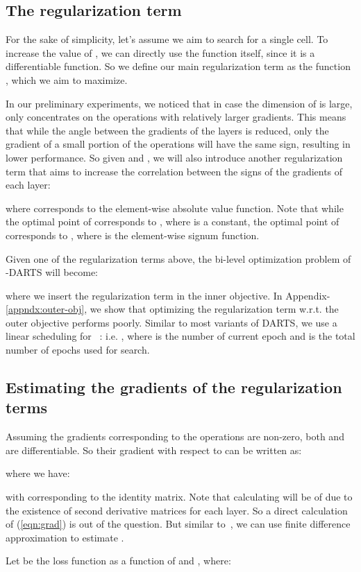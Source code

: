 \documentclass{article} \usepackage{fancyhdr, iclr2023_conference, times}
\newcommand{\mydarts}{-DARTS\xspace}
\begin{document}
\subsection{The regularization term}
For the sake of simplicity, let's assume we aim to search for a single cell. To increase the value of , we can directly use the function itself, since it is a differentiable function. So we define our main regularization term as the function , which we aim to maximize.
\par In our preliminary experiments, we noticed that in case the dimension of  is large,  only concentrates on the operations with relatively larger gradients. This means that while the angle between the gradients of the layers is reduced, only the gradient of a small portion of the operations will have the same sign, resulting in lower performance. So given  and , we will also introduce another regularization term that aims to increase the correlation between the signs of the gradients of each layer:

where  corresponds to the element-wise absolute value function. Note that while the optimal point of  corresponds to , where  is a constant, the optimal point of  corresponds to , where  is the element-wise signum function.
\par Given one of the regularization terms above, the bi-level optimization problem of \mydarts will become:

where we insert the regularization term in the inner objective. In Appendix-\ref{appndx:outer-obj}, we show that optimizing the regularization term w.r.t. the outer objective performs poorly.
Similar to most variants of DARTS, we use a linear scheduling for ~\citep{DBLP:conf/iclr/ZelaESMBH20, DBLP:conf/icml/ChenH20}: i.e. , where  is the number of current epoch and  is the total number of epochs used for search.
\subsection{Estimating the gradients of the regularization terms}
Assuming the gradients corresponding to the operations are non-zero, both  and  are differentiable. So their gradient with respect to  can be written as:

where we have:

with  corresponding to the identity matrix. Note that calculating  will be of  due to the existence of second derivative matrices for each layer. So a direct calculation of (\ref{eqn:grad}) is out of the question. But similar to~\citep{DBLP:conf/iclr/LiuSY19}, we can use finite difference approximation to estimate .
\par Let  be the loss function as a function of  and , where:
\end{document}
